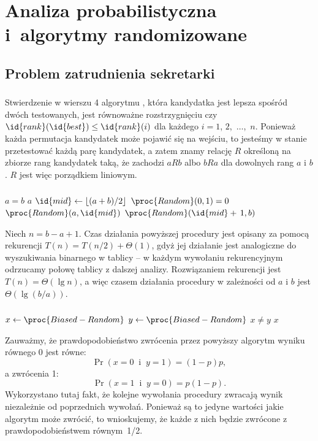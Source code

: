 \chapter{Analiza probabilistyczna i~algorytmy randomizowane}

\section{Problem zatrudnienia sekretarki}

\subsection{} %
Stwierdzenie w wierszu 4 algorytmu , która kandydatka jest lepsza spośród dwóch testowanych, jest równoważne rozstrzygnięciu czy $\id{rank}(\id{best})\le\id{rank}(i)$ dla każdego $i=1$, $2$,~$\dots$,~$n$. Ponieważ każda permutacja kandydatek może pojawić się na wejściu, to jesteśmy w stanie przetestować każdą parę kandydatek, a zatem znamy relację $R$ określoną na zbiorze rang kandydatek taką, że zachodzi $aRb$ albo $bRa$ dla dowolnych rang $a$ i $b$. $R$ jest więc porządkiem liniowym.

\subsection{} %
\begin{codebox}
\li	\If $a=b$
\li		\Then
			\Return $a$
		\End
\li	$\id{mid}\gets\lfloor(a+b)/2\rfloor$
\li	\If $\proc{Random}(0,1)=0$
\li		\Then
			\Return $\proc{Random}(a,\id{mid})$
\li		\Else
			\Return $\proc{Random}(\id{mid}+\,1,b)$
		\End
\end{codebox}
Niech $n=b-a+1$. Czas działania powyższej procedury jest opisany za pomocą rekurencji $T(n)=T(n/2)+\Theta(1)$, gdyż jej działanie jest analogiczne do wyszukiwania binarnego w  tablicy -- w każdym wywołaniu rekurencyjnym odrzucamy połowę tablicy z dalszej analizy. Rozwiązaniem rekurencji jest $T(n)=\Theta(\lg n)$, a więc czasem działania procedury  w zależności od $a$ i $b$ jest $\Theta(\lg(b/a))$.

\subsection{} %
\begin{codebox}
\li	\Repeat
		$x\gets\proc{Biased-Random}$
\li		$y\gets\proc{Biased-Random}$
\li	\Until $x\ne y$ \label{li:unbiased-repeat-end}
\li \Return $x$
\end{codebox}
Zauważmy, że prawdopodobieństwo zwrócenia przez powyższy algorytm wyniku równego 0 jest równe:
\[
	\Pr(x=0\;\;\text{i}\;\;y=1) = (1-p)p,
\]
a zwrócenia 1:
\[
	\Pr(x=1\;\;\text{i}\;\;y=0) = p(1-p).
\]
Wykorzystano tutaj fakt, że kolejne wywołania procedury  zwracają wynik niezależnie od poprzednich wywołań. Ponieważ są to jedyne wartości jakie algorytm może zwrócić, to wnioskujemy, że każde z nich będzie zwrócone z prawdopodobieństwem równym~1/2.

